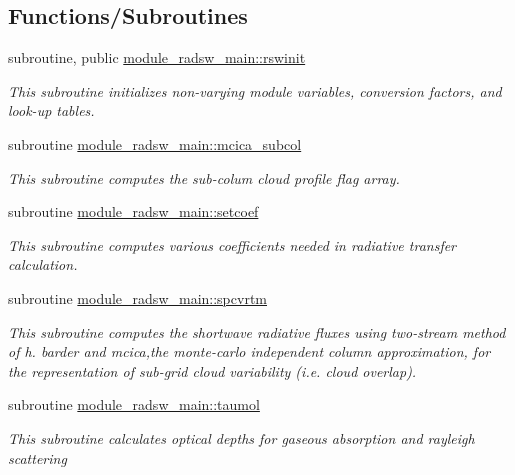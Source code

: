 \subsection*{Functions/\+Subroutines}
\begin{DoxyCompactItemize}
\item 
subroutine, public \hyperlink{group__module__radsw__main_ga9288a5da63d182f20c99e0044ca52f29}{module\+\_\+radsw\+\_\+main\+::rswinit}
\begin{DoxyCompactList}\small\item\em This subroutine initializes non-\/varying module variables, conversion factors, and look-\/up tables. \end{DoxyCompactList}\item 
subroutine \hyperlink{group__module__radsw__main_gae5916f7b0f63f7836a8ab80ce3933482}{module\+\_\+radsw\+\_\+main\+::mcica\+\_\+subcol}
\begin{DoxyCompactList}\small\item\em This subroutine computes the sub-\/colum cloud profile flag array. \end{DoxyCompactList}\item 
subroutine \hyperlink{group__module__radsw__main_gaaa580fe228ccc04abd54368c8df0f312}{module\+\_\+radsw\+\_\+main\+::setcoef}
\begin{DoxyCompactList}\small\item\em This subroutine computes various coefficients needed in radiative transfer calculation. \end{DoxyCompactList}\item 
subroutine \hyperlink{group__module__radsw__main_gae30ee993080f035f0e05cda7c7baffce}{module\+\_\+radsw\+\_\+main\+::spcvrtm}
\begin{DoxyCompactList}\small\item\em This subroutine computes the shortwave radiative fluxes using two-\/stream method of h. barder and mcica,the monte-\/carlo independent column approximation, for the representation of sub-\/grid cloud variability (i.\+e. cloud overlap). \end{DoxyCompactList}\item 
subroutine \hyperlink{group__module__radsw__main_gaafef1e054b5103007f57129c07fcba81}{module\+\_\+radsw\+\_\+main\+::taumol}
\begin{DoxyCompactList}\small\item\em This subroutine calculates optical depths for gaseous absorption and rayleigh scattering ~\newline

\end{DoxyCompactList}
\end{DoxyCompactItemize}
